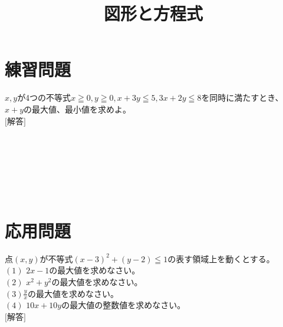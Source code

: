 \documentclass[12pt]{jarticle}
\title{図形と方程式}
\begin{document}
\date{}
\maketitle
\vspace{-2cm}
\section{練習問題}
$x,y$が4つの不等式$x\geqq 0,y\geqq 0,x+3y\leqq 5, 3x+2y\leqq 8$を同時に満たすとき、$x+y$の最大値、最小値を求めよ。\\
$[$解答$]$
\\
\\
\\
\\
\\
\\
\\
\section{応用問題}
点$(x, y)$が不等式$(x-3)^2 + (y-2)\leqq 1$の表す領域上を動くとする。\\
$(1)$ $2x-1$の最大値を求めなさい。\\
$(2)$ $x^2+y^2$の最大値を求めなさい。\\
$(3)$$\displaystyle \frac{y}{x}$の最大値を求めなさい。\\
$(4)$ $10x+10y$の最大値の整数値を求めなさい。\\
$[$解答$]$
\end{document}
